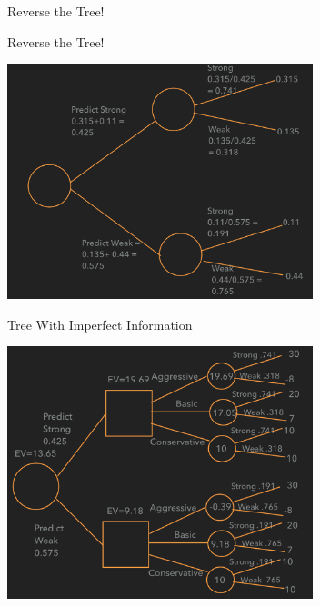 \documentclass{beamer}\usepackage[]{graphicx}\usepackage[]{color}
\begin{document}
\begin{darkframes}
\begin{frame}[fragile]{Reverse the Tree!}
    \end{frame}


    \begin{frame}[fragile]{Reverse the Tree!}

      \begin{center}
        \includegraphics[width=3.5in]{AfterFlip} \\
      \end{center}

    \end{frame}


    \begin{frame}[fragile]{Tree With Imperfect Information}
       
      \begin{center}
        \includegraphics[width=3.5in]{BevoImperfect} \\
      \end{center}

    \end{frame}



\end{darkframes}
\end{document}
